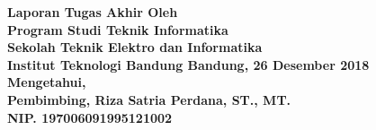 \clearpage
\pagestyle{empty}

\begin{center}
\smallskip
    \Large \bfseries \MakeUppercase{\thetitle}
    \vfill
    \Large Laporan Tugas Akhir
    \vfill
    \large Oleh
    \Large \uppercase{\theauthor} \\
    \large Program Studi Teknik Informatika \\ Sekolah Teknik Elektro dan Informatika \\ Institut Teknologi Bandung
    \vfill
    \normalsize \normalfont
    \vfill
    Bandung, 26 Desember 2018 \\
    Mengetahui, \\
    Pembimbing,
    \vfill
    \vfill
    \vfill
    Riza Satria Perdana, ST., MT. \\
    NIP. 197006091995121002
\end{center}
\clearpage
